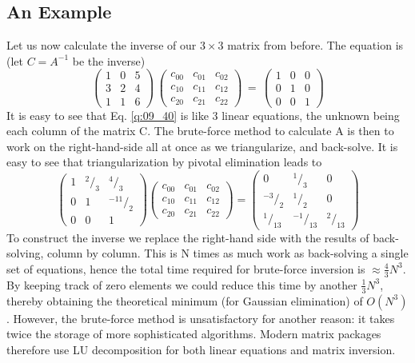 \subsection{An Example} 
Let us now calculate the inverse of our $3\times 3$ matrix from before.
The equation is (let $C = A^{-1}$ be the inverse)
\begin{equation}
    \label{eq:09_40}
    \begin{pmatrix}
        1&0 &5\\ 
        3&2 &4\\ 
        1&1 &6
    \end{pmatrix}
    \,
    \begin{pmatrix}
        c_{00}&c_{01} &c_{02}\\ 
        c_{10}&c_{11} &c_{12}\\ 
        c_{20}&c_{21} &c_{22}
    \end{pmatrix}
    \, = \,
    \begin{pmatrix}
        1&0 &0\\ 
        0&1 &0\\ 
        0&0 &1
    \end{pmatrix}
\end{equation} 
It is easy to see that Eq. \ref{q:09_40} is like 3 linear equations, the unknown
being each column of the matrix C. The brute-force method to
calculate A is then to work on the right-hand-side all at once as
we triangularize, and back-solve. It is easy to see that
triangularization by pivotal elimination leads to
\begin{equation}
    \label{eq:09_41}
    \begin{pmatrix}
        1&^2/_3 &^4/_3\\ 
        0&1 &^{-11}/_2\\ 
        0&0 &1
    \end{pmatrix}
    \begin{pmatrix}
        c_{00}&c_{01} &c_{02}\\ 
        c_{10}&c_{11} &c_{12}\\ 
        c_{20}&c_{21} &c_{22}
    \end{pmatrix}
    =
    \begin{pmatrix}
        0&^1/_3&0\\ 
        ^{-3}/_2 &^1/_2&0\\ 
         ^1/_{13} &         ^{-1}/_{13} &        ^2/_{13}
    \end{pmatrix}
\end{equation} 
To construct the inverse we replace the right-hand side with the 
results of back-solving, column by column. This is N times as
much work as back-solving a single set of equations, hence the
total time required for brute-force inversion is $\approx \frac{4}{3}N^3$. By keeping track of zero elements we could reduce this time by another
$\frac{1}{3}N^3$, thereby obtaining the theoretical minimum (for Gaussian
elimination) of $O(N^3)$. However, the brute-force method is unsatisfactory for another reason: it takes twice the storage of more
sophisticated algorithms. Modern matrix packages therefore use
LU decomposition for both linear equations and matrix inversion.

